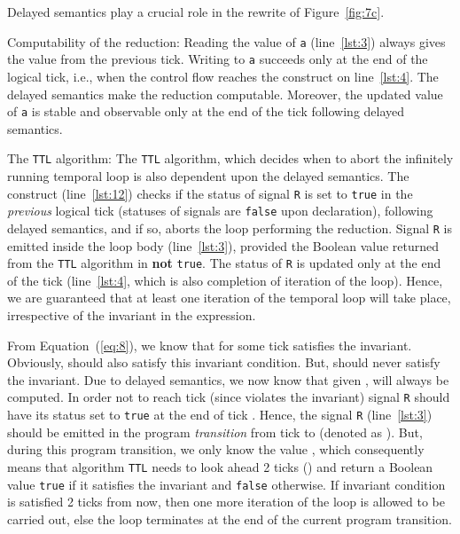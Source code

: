 \documentclass[10pt,journal,cspaper,compsoc]{IEEEtran}
\begin{document}
Delayed semantics play a crucial role in the rewrite of
Figure~\ref{fig:7c}.
\begin{compactitem}
\item Computability of the reduction: Reading the value of \texttt{a}
  (line~\ref{lst:3}) always gives the value from the previous
  tick. Writing to \texttt{a} succeeds only at the end of the logical
  tick, i.e., when the control flow reaches the 
  construct on line~\ref{lst:4}. The delayed semantics make the
  reduction computable. Moreover, the updated value of \texttt{a} is
  stable and observable only at the end of the tick following delayed
  semantics.
\item The \texttt{TTL} algorithm: The \texttt{TTL} algorithm, which
  decides when to abort the infinitely running temporal loop is also
  dependent upon the delayed semantics. The  construct
  (line~\ref{lst:12}) checks if the status of signal \texttt{R} is set
  to \texttt{true} in the \textit{previous} logical tick (statuses of
  signals are \texttt{false} upon declaration), following delayed
  semantics, and if so, aborts the loop performing the reduction. Signal
  \texttt{R} is emitted inside the loop body (line~\ref{lst:3}),
  provided the Boolean value returned from the \texttt{TTL} algorithm in
  \textbf{not} \texttt{true}. The status of \texttt{R} is updated only
  at the end of the tick (line~\ref{lst:4}, which is also completion of
  iteration of the loop). Hence, we are guaranteed that at least one
  iteration of the temporal loop will take place, irrespective of the
  invariant in the  expression.
  
  From Equation~(\ref{eq:8}), we know that  for some tick 
  satisfies the  invariant. Obviously,  should
  also satisfy this invariant condition. But,  should never
  satisfy the  invariant. Due to delayed semantics, we
  now know that given ,  will always be computed. In order
  not to reach tick  (since  violates the 
  invariant) signal \texttt{R} should have its status set to
  \texttt{true} at the end of tick . Hence, the signal \texttt{R}
  (line~\ref{lst:3}) should be emitted in the program
  \textit{transition} from tick  to  (denoted as
  ). But, during this program transition, we only know the
  value , which consequently means that algorithm \texttt{TTL}
  needs to look ahead 2 ticks () and return a Boolean value
  \texttt{true} if it satisfies the  invariant and
  \texttt{false} otherwise. If invariant condition is satisfied 2 ticks
  from now, then one more iteration of the loop is allowed to be carried
  out, else the loop terminates at the end of the current program
  transition.
\end{compactitem}
\end{document}
